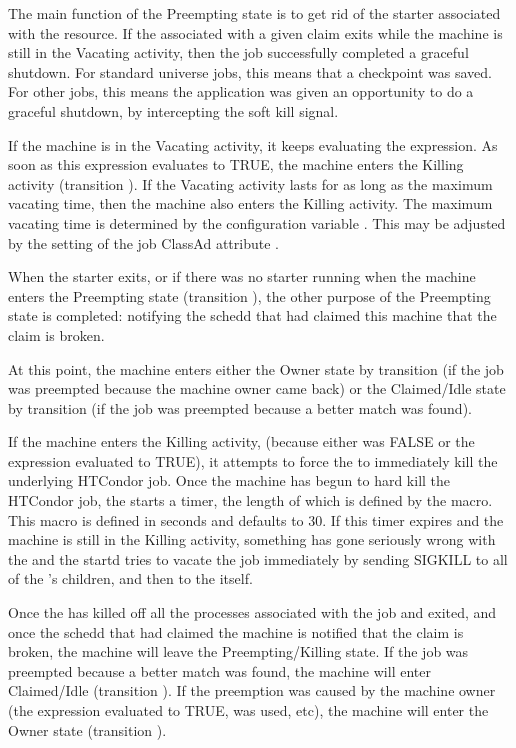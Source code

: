 The main function of the Preempting state is to get rid of the starter
associated with the resource.  If the  associated with
a given claim exits while the machine is still in the Vacating
activity, then the job successfully completed a graceful shutdown.
For standard universe jobs, this means that a checkpoint was saved.
For other jobs, this means the application was given an opportunity to
do a graceful shutdown, by intercepting the soft kill signal.

If the machine is in the Vacating activity, it keeps evaluating the 
 expression.
As soon as this expression evaluates to TRUE,
the machine enters the Killing activity (transition ).
If the Vacating activity lasts for as long as the maximum
vacating time, then the machine also enters the Killing activity.
The maximum vacating time is determined by the configuration variable
.
This may be adjusted by the setting of the job ClassAd
attribute .

When the starter exits, or if there was no starter running when the
machine enters the Preempting state (transition ),
the other purpose of the Preempting state is completed:
notifying the schedd that had claimed this machine that the claim is
broken.

At this point, the machine enters either the Owner state by
transition  (if the job was preempted because the machine
owner came back) or the Claimed/Idle state by transition 
(if the job was preempted because a better match was found).

If the machine enters the Killing activity, (because either
 was FALSE or the  expression evaluated
to TRUE), it attempts to force the  to immediately
kill the underlying HTCondor job.
Once the machine has begun to hard kill the HTCondor job, the
 starts a timer, the length of which is defined by the
 \label{param:KillingTimeout} macro.
This macro is defined in seconds and defaults to 30.
If this timer expires and the machine is still in
the Killing activity, something has gone seriously wrong with the
 and the startd tries to vacate the job immediately by
sending SIGKILL to all of the 's children, and then to
the  itself.

Once the  has killed off all the processes associated
with the job and exited, and once the schedd that had claimed the
machine is notified that the claim is broken, the machine will leave
the Preempting/Killing state.
If the job was preempted because a better match was found, the machine
will enter Claimed/Idle (transition ).
If the preemption was caused by the machine owner (the 
expression evaluated to TRUE,  was used, etc), the
machine will enter the Owner state (transition ).



